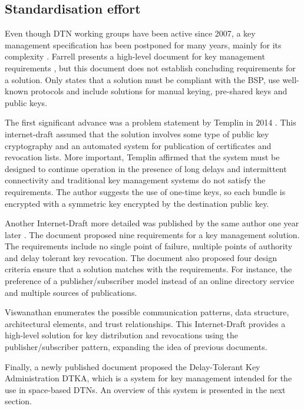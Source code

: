 \subsection{Standardisation effort}

Even though DTN working groups have been active since 2007, a key management specification has been postponed for many years, mainly for its complexity \cite{rfc6257,irtf-dtnrg-sec-overview-06,templin-dtnskmps-00}. Farrell presents a high-level document for key management requirements \cite{farrell-dtnrg-km-00}, but this document does not establish concluding requirements for a solution. Only states that a solution must be compliant with the BSP, use well-known protocols and include solutions for manual keying, pre-shared keys and public keys.  


The first significant advance was a problem statement by Templin in 2014  \cite{templin-dtnskmps-00}. This internet-draft assumed that the solution involves some type of public key cryptography and an automated system for publication of certificates and revocation lists. More important, Templin affirmed that the system must be designed to continue operation in the presence of long delays and intermittent connectivity and traditional key management systems do not satisfy the requirements. The author suggests the use of one-time keys, so each bundle is encrypted with a symmetric key encrypted by the destination public key. 

Another Internet-Draft more detailed was published by the same author one year later \cite{templin-dtnskmreq-00}. The document proposed nine requirements for a key management solution. The requirements include no single point of failure, multiple points of authority and delay tolerant key revocation. The document also proposed four design criteria ensure that a solution matches with the requirements. For instance, the preference of a publisher/subscriber model instead of an online directory service and multiple sources of publications. 

Viswanathan \cite{viswanathan-dtn-pkdn-00} enumerates the possible communication patterns, data structure, architectural elements, and trust relationships.  This Internet-Draft provides a high-level solution for key distribution and revocations using the publisher/subscriber pattern, expanding the idea of previous documents.

Finally, a newly published document proposed the Delay-Tolerant Key Administration DTKA, which is a system for key management intended for the use in space-based DTNs. An overview of this system is presented in the next section.


